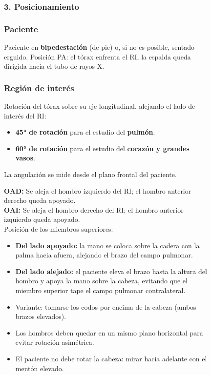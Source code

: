 \begin{figure}
{%
\subsubsection*{3. Posicionamiento}

\subsubsection*{Paciente}

Paciente en \textbf{bipedestación} (de pie) o, si no es posible, sentado erguido. Posición PA:
el tórax enfrenta el RI, la espalda queda dirigida hacia el tubo de rayos X.

\subsubsection*{Región de interés}

Rotación del tórax sobre su eje longitudinal, alejando el lado de interés del RI:

\begin{itemize}
  \item \textbf{45° de rotación} para el estudio del \textbf{pulmón}.
  \item \textbf{60° de rotación} para el estudio del \textbf{corazón y grandes vasos}.
\end{itemize}

La angulación se mide desde el plano frontal del paciente.

\textbf{OAD:} Se aleja el hombro izquierdo del RI; el hombro anterior derecho queda apoyado.\\
\textbf{OAI:} Se aleja el hombro derecho del RI; el hombro anterior izquierdo queda apoyado.\\

Posición de los miembros superiores:

\begin{itemize}
  \item \textbf{Del lado apoyado:} la mano se coloca sobre la cadera con la palma hacia afuera,
        alejando el brazo del campo pulmonar.
  \item \textbf{Del lado alejado:} el paciente eleva el brazo hasta la altura del hombro y apoya
        la mano sobre la cabeza, evitando que el miembro superior tape el campo pulmonar contralateral.
  \item Variante: tomarse los codos por encima de la cabeza (ambos brazos elevados).
  \item Los hombros deben quedar en un mismo plano horizontal para evitar rotación asimétrica.
  \item El paciente no debe rotar la cabeza: mirar hacia adelante con el mentón elevado.
\end{itemize}

}
\end{figure}
